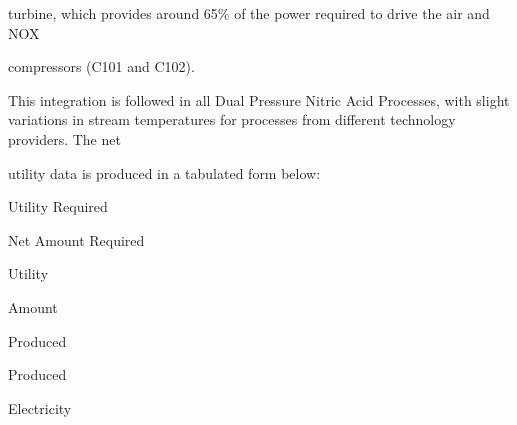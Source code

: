 \documentclass[a4paper,portrait,12pt]{article}
\begin{document}
\begin{flushleft}
turbine, which provides around 65\% of the power required to drive the air and NOX
\end{flushleft}


\begin{flushleft}
compressors (C101 and C102).
\end{flushleft}


\begin{flushleft}
This integration is followed in all Dual Pressure Nitric Acid Processes, with slight variations in stream temperatures for processes from different technology providers. The net
\end{flushleft}


\begin{flushleft}
utility data is produced in a tabulated form below:
\end{flushleft}





\begin{flushleft}
Utility Required
\end{flushleft}





\begin{flushleft}
Net Amount Required
\end{flushleft}





\begin{flushleft}
Utility
\end{flushleft}





\begin{flushleft}
Amount
\end{flushleft}





\begin{flushleft}
Produced
\end{flushleft}





\begin{flushleft}
Produced
\end{flushleft}





\begin{flushleft}
Electricity
\end{flushleft}
\end{document}

